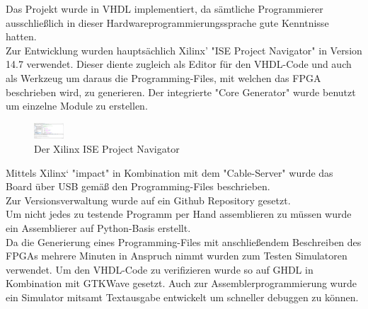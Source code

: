 Das Projekt wurde in VHDL implementiert, da s\"amtliche Programmierer ausschlie{\ss}lich in dieser Hardwareprogrammierungssprache gute Kenntnisse hatten.\\
Zur Entwicklung wurden haupts\"achlich Xilinx' "ISE Project Navigator" in Version 14.7 verwendet. Dieser diente zugleich als Editor f\"ur den VHDL-Code und auch als Werkzeug um daraus die Programming-Files, mit welchen das FPGA beschrieben wird, zu generieren. Der integrierte "Core Generator" wurde benutzt um einzelne Module zu erstellen.\\
\begin{figure}[H]
	\centering
		\includegraphics[width=0.1\textwidth]{ISE.png}
	\caption{Der Xilinx ISE Project Navigator}
	\label{fig:tool}
\end{figure}
Mittels Xilinx‘ "impact" in Kombination mit dem "Cable-Server" wurde das Board \"uber USB gem\"a{\ss} den Programming-Files beschrieben.\\
Zur Versionsverwaltung wurde auf ein Github Repository gesetzt.\\ 
Um nicht jedes zu testende Programm per Hand assemblieren zu m\"ussen wurde ein Assemblierer auf Python-Basis erstellt.\\
Da die Generierung eines Programming-Files mit anschlie{\ss}endem Beschreiben des FPGAs mehrere Minuten in Anspruch nimmt wurden zum Testen Simulatoren verwendet. Um den VHDL-Code zu verifizieren wurde so auf GHDL in Kombination mit GTKWave gesetzt. Auch zur Assemblerprogrammierung wurde ein Simulator mitsamt Textausgabe entwickelt um schneller debuggen zu k\"onnen.
